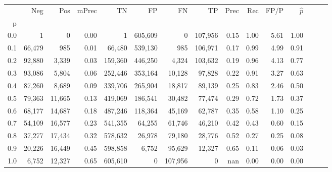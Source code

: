 \begin{tabular}{rrrrrrrrrrrrrrr}
\toprule
{} &     Neg &     Pos & mPrec &       TN &       FP &       FN &       TP &  Prec &   Rec &  FP/P & $\hat{p}$ \\
p   &         &         &       &          &          &          &          &       &       &       &           \\
\midrule
0.0 &       1 &       0 &  0.00 &        1 &  605,609 &        0 &  107,956 &  0.15 &  1.00 &  5.61 &      1.00 \\
0.1 &  66,479 &     985 &  0.01 &   66,480 &  539,130 &      985 &  106,971 &  0.17 &  0.99 &  4.99 &      0.91 \\
0.2 &  92,880 &   3,339 &  0.03 &  159,360 &  446,250 &    4,324 &  103,632 &  0.19 &  0.96 &  4.13 &      0.77 \\
0.3 &  93,086 &   5,804 &  0.06 &  252,446 &  353,164 &   10,128 &   97,828 &  0.22 &  0.91 &  3.27 &      0.63 \\
0.4 &  87,260 &   8,689 &  0.09 &  339,706 &  265,904 &   18,817 &   89,139 &  0.25 &  0.83 &  2.46 &      0.50 \\
0.5 &  79,363 &  11,665 &  0.13 &  419,069 &  186,541 &   30,482 &   77,474 &  0.29 &  0.72 &  1.73 &      0.37 \\
0.6 &  68,177 &  14,687 &  0.18 &  487,246 &  118,364 &   45,169 &   62,787 &  0.35 &  0.58 &  1.10 &      0.25 \\
0.7 &  54,109 &  16,577 &  0.23 &  541,355 &   64,255 &   61,746 &   46,210 &  0.42 &  0.43 &  0.60 &      0.15 \\
0.8 &  37,277 &  17,434 &  0.32 &  578,632 &   26,978 &   79,180 &   28,776 &  0.52 &  0.27 &  0.25 &      0.08 \\
0.9 &  20,226 &  16,449 &  0.45 &  598,858 &    6,752 &   95,629 &   12,327 &  0.65 &  0.11 &  0.06 &      0.03 \\
1.0 &   6,752 &  12,327 &  0.65 &  605,610 &        0 &  107,956 &        0 &   nan &  0.00 &  0.00 &      0.00 \\
\bottomrule
\end{tabular}
